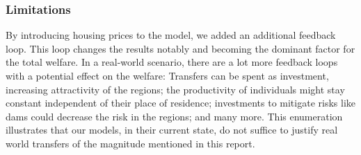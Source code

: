 \documentclass[10pt,a4paper]{article}
\begin{document}
\subsubsection{Limitations}
By introducing housing prices to the model, we added an additional feedback loop. This loop changes the results notably and becoming the dominant factor for the total welfare. In a real-world scenario, there are a lot more feedback loops with a potential effect on the welfare: Transfers can be spent as investment, increasing attractivity of the regions; the productivity of individuals might stay constant independent of their place of residence; investments to mitigate risks like dams could decrease the risk in the regions; and many more. This enumeration illustrates that our models, in their current state, do not suffice to justify real world transfers of the magnitude mentioned in this report.
\newpage
\end{document}
